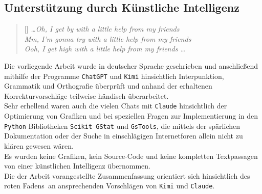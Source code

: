 \subsection{Unterstützung durch Künstliche Intelligenz}
\settowidth{\versewidth}{Mm, I'm gonna try with a little help from my friends}
\begin{verse}[\versewidth]
\textit{\ldots Oh, I get by with a little help from my friends\\
Mm, I'm gonna try with a little help from my friends \\
Ooh, I get high with a little help from my friends \ldots}
\end{verse}

\vspace*{0.5cm}
Die vorliegende Arbeit wurde in deutscher Sprache geschrieben
und anschließend mithilfe der Programme \texttt{ChatGPT} und 
\texttt{Kimi} hinsichtlich Interpunktion, Grammatik und Orthografie überprüft 
und anhand der erhaltenen Korrekturvorschläge teilweise 
händisch überarbeitet.\\

Sehr erhellend waren auch die vielen Chats mit 
\texttt{Claude} hinsichtlich der Optimierung von Grafiken und bei 
speziellen Fragen zur Implementierung in den 
\texttt{Python} Bibliotheken \texttt{Scikit GStat} und 
\texttt{GsTools}, die mittels der spärlichen Dokumentation oder 
der Suche in einschlägigen Internetforen allein nicht zu klären gewesen wären. \\

Es wurden keine Grafiken, kein Source-Code und 
keine kompletten Textpassagen von einer künstlichen Intelligenz übernommen.\\

Die der Arbeit vorangestellte Zusammenfassung orientiert sich hinsichtlich des
\glqq roten Fadens\grqq\ an ansprechenden Vorschlägen von \texttt{Kimi} 
und \texttt{Claude}.  



